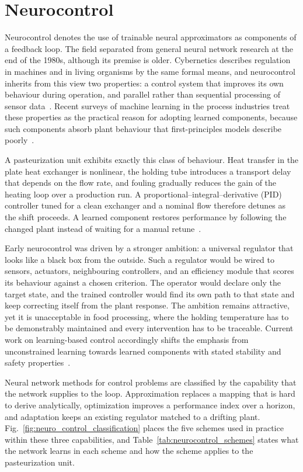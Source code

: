 \section{Neurocontrol}

Neurocontrol denotes the use of trainable neural approximators as components of
a feedback loop. The field separated from general neural network research at the
end of the 1980s, although its premise is older. Cybernetics describes
regulation in machines and in living organisms by the same formal means, and
neurocontrol inherits from this view two properties: a control system that
improves its own behaviour during operation, and parallel rather than sequential
processing of sensor data~\cite{Uskov_2004, Neurocomputers}. Recent surveys of
machine learning in the process industries treat these properties as the
practical reason for adopting learned components, because such components absorb
plant behaviour that first-principles models describe
poorly~\cite{Lawrence2024}.

A pasteurization unit exhibits exactly this class of behaviour. Heat transfer in
the plate heat exchanger is nonlinear, the holding tube introduces a transport
delay that depends on the flow rate, and fouling gradually reduces the gain of
the heating loop over a production run. A proportional--integral--derivative
(PID) controller tuned for a clean exchanger and a nominal flow therefore
detunes as the shift proceeds. A learned component restores performance by
following the changed plant instead of waiting for a manual
retune~\cite{Park2025rl}.

Early neurocontrol was driven by a stronger ambition: a universal regulator that
looks like a black box from the outside. Such a regulator would be wired to
sensors, actuators, neighbouring controllers, and an efficiency module that
scores its behaviour against a chosen criterion. The operator would declare only
the target state, and the trained controller would find its own path to that
state and keep correcting itself from the plant response. The ambition remains
attractive, yet it is unacceptable in food processing, where the holding
temperature has to be demonstrably maintained and every intervention has to be
traceable. Current work on learning-based control accordingly shifts the
emphasis from unconstrained learning towards learned components with stated
stability and safety properties~\cite{Lawrence2024, Park2025rl}.

Neural network methods for control problems are classified by the capability
that the network supplies to the loop. Approximation replaces a mapping that is
hard to derive analytically, optimization improves a performance index over a
horizon, and adaptation keeps an existing regulator matched to a drifting plant.
Fig.~\ref{fig:neuro_control_classification} places the five schemes used in
practice within these three capabilities, and
Table~\ref{tab:neurocontrol_schemes} states what the network learns in each
scheme and how the scheme applies to the pasteurization unit.

